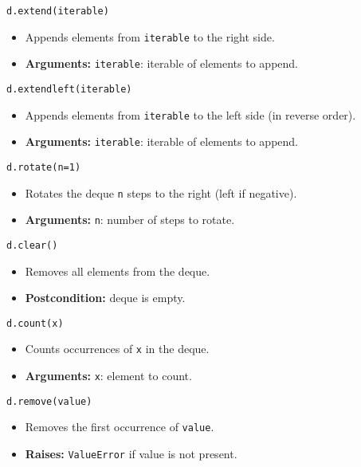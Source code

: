 \begin{summary}
\begin{lstlisting}
d.extend(iterable)
\end{lstlisting}
\begin{itemize}
    \item Appends elements from \texttt{iterable} to the right side.
    \item \textbf{Arguments:} \texttt{iterable}: iterable of elements to append.
\end{itemize}

\begin{lstlisting}
d.extendleft(iterable)
\end{lstlisting}
\begin{itemize}
    \item Appends elements from \texttt{iterable} to the left side (in reverse order).
    \item \textbf{Arguments:} \texttt{iterable}: iterable of elements to append.
\end{itemize}

\begin{lstlisting}
d.rotate(n=1)
\end{lstlisting}
\begin{itemize}
    \item Rotates the deque \texttt{n} steps to the right (left if negative).
    \item \textbf{Arguments:} \texttt{n}: number of steps to rotate.
\end{itemize}

\begin{lstlisting}
d.clear()
\end{lstlisting}
\begin{itemize}
    \item Removes all elements from the deque.
    \item \textbf{Postcondition:} deque is empty.
\end{itemize}

\begin{lstlisting}
d.count(x)
\end{lstlisting}
\begin{itemize}
    \item Counts occurrences of \texttt{x} in the deque.
    \item \textbf{Arguments:} \texttt{x}: element to count.
\end{itemize}

\begin{lstlisting}
d.remove(value)
\end{lstlisting}
\begin{itemize}
    \item Removes the first occurrence of \texttt{value}.
    \item \textbf{Raises:} \texttt{ValueError} if value is not present.
\end{itemize}

\end{summary}
\newpage

